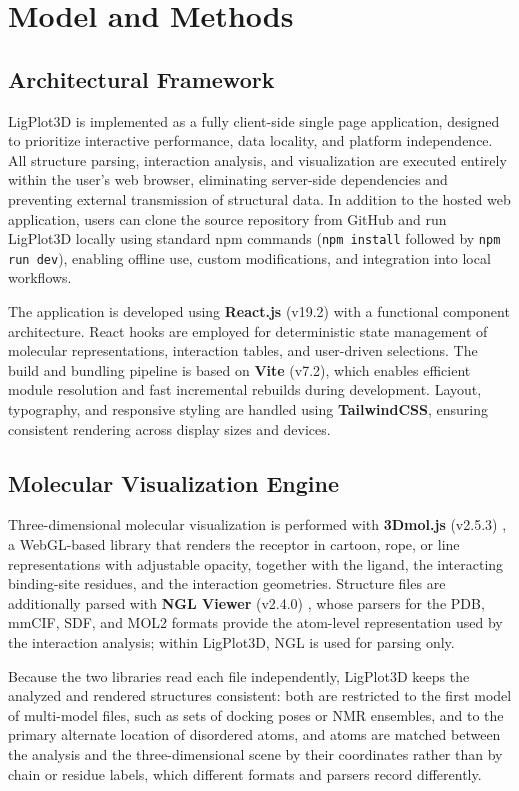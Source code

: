 \documentclass[journal=jacsat,manuscript=article]{achemso}
\begin{document}
\section{Model and Methods}

\subsection{Architectural Framework}
LigPlot3D is implemented as a fully client-side single page application, designed to prioritize interactive performance, data locality, and platform independence. All structure parsing, interaction analysis, and visualization are executed entirely within the user’s web browser, eliminating server-side dependencies and preventing external transmission of structural data. In addition to the hosted web application, users can clone the source repository from GitHub and run LigPlot3D locally using standard npm commands (\texttt{npm install} followed by \texttt{npm run dev}), enabling offline use, custom modifications, and integration into local workflows.

The application is developed using \textbf{React.js} (v19.2) with a functional component architecture. React hooks are employed for deterministic state management of molecular representations, interaction tables, and user-driven selections. The build and bundling pipeline is based on \textbf{Vite} (v7.2), which enables efficient module resolution and fast incremental rebuilds during development. Layout, typography, and responsive styling are handled using \textbf{TailwindCSS}, ensuring consistent rendering across display sizes and devices.

\subsection{Molecular Visualization Engine}
Three-dimensional molecular visualization is performed with \textbf{3Dmol.js} (v2.5.3) \cite{rego20153dmol}, a WebGL-based library that renders the receptor in cartoon, rope, or line representations with adjustable opacity, together with the ligand, the interacting binding-site residues, and the interaction geometries. Structure files are additionally parsed with \textbf{NGL Viewer} (v2.4.0) \cite{rose2015ngl,rose2018ngl}, whose parsers for the PDB, mmCIF, SDF, and MOL2 formats provide the atom-level representation used by the interaction analysis; within LigPlot3D, NGL is used for parsing only.

Because the two libraries read each file independently, LigPlot3D keeps the analyzed and rendered structures consistent: both are restricted to the first model of multi-model files, such as sets of docking poses or NMR ensembles, and to the primary alternate location of disordered atoms, and atoms are matched between the analysis and the three-dimensional scene by their coordinates rather than by chain or residue labels, which different formats and parsers record differently.
\end{document}
